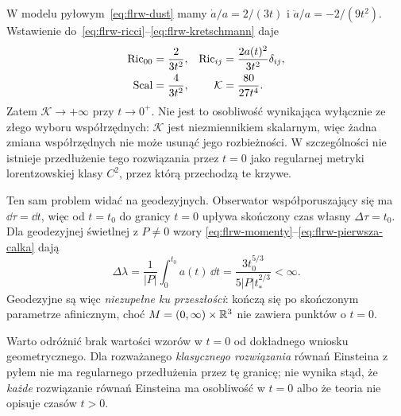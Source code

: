 \begin{przyklad}
\label{prz:flrw-osobliwosc}
W modelu pyłowym~\eqref{eq:flrw-dust} mamy
$\dot a/a=2/(3t)$ i $\ddot a/a=-2/(9t^2)$.
Wstawienie do~\eqref{eq:flrw-ricci}--\eqref{eq:flrw-kretschmann}
daje
\begin{align}\label{eq:flrw-dust-curvature}
 \mathrm{Ric}_{00}&=\frac{2}{3t^2},&
 \mathrm{Ric}_{ij}&=\frac{2a(t)^2}{3t^2}\delta_{ij},\notag\\
 \mathrm{Scal}&=\frac{4}{3t^2},&
 \mathcal K&=\frac{80}{27t^4}.
\end{align}
Zatem $\mathcal K\to+\infty$ przy $t\to0^+$.
Nie jest to osobliwość wynikająca wyłącznie ze złego wyboru
współrzędnych: $\mathcal K$ jest niezmiennikiem skalarnym,
więc żadna zmiana współrzędnych nie może usunąć jego
rozbieżności. W szczególności nie istnieje przedłużenie
tego rozwiązania przez $t=0$ jako regularnej metryki
lorentzowskiej klasy $C^2$, przez którą przechodzą te krzywe.

Ten sam problem widać na geodezyjnych.
Obserwator współporuszający się ma $\dd\tau=\dd t$,
więc od $t=t_0$ do granicy $t=0$ upływa skończony
czas własny $\Delta\tau=t_0$.
Dla geodezyjnej świetlnej z $P\ne0$ wzory
\eqref{eq:flrw-momenty}--\eqref{eq:flrw-pierwsza-calka} dają
\[
 \Delta\lambda=\frac1{|P|}\int_0^{t_0}a(t)\,\dd t
 =\frac{3t_0^{5/3}}{5|P|t_*^{2/3}}<\infty.
\]
Geodezyjne są więc \emph{niezupełne ku przeszłości}:
kończą się po skończonym parametrze afinicznym, choć
$M=(0,\infty)\times\mathbb{R}^3$ nie zawiera punktów o $t=0$.

Warto odróżnić brak wartości wzorów w $t=0$ od dokładnego
wniosku geometrycznego. Dla rozważanego \emph{klasycznego
rozwiązania} równań Einsteina z pyłem nie ma regularnego
przedłużenia przez tę granicę; nie wynika stąd, że
\emph{każde} rozwiązanie równań Einsteina ma osobliwość
w $t=0$ albo że teoria nie opisuje czasów $t>0$.
\end{przyklad}

